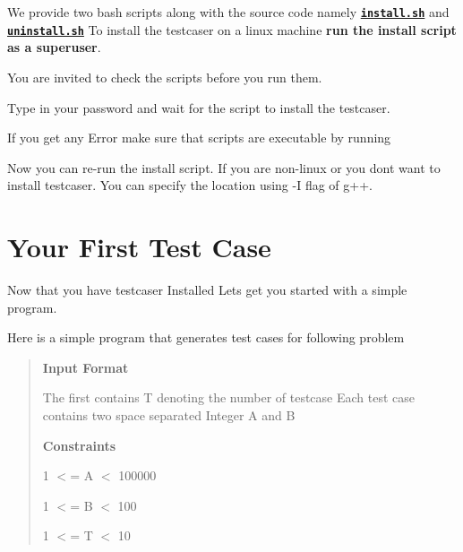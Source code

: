 We provide two bash scripts along with the source code namely 
\href{https://github.com/coder3101/testcaser/blob/master/install.sh}{\texttt{ {\bfseries{install.\+sh}}}} and 
\href{https://github.com/coder3101/testcaser/blob/master/uninstall.sh}{\texttt{ {\bfseries{uninstall.\+sh}}}} To install the testcaser on a linux machine {\bfseries{run the install script as a superuser}}.

You are invited to check the scripts before you run them.


\begin{DoxyCode}{0}
\end{DoxyCode}


Type in your password and wait for the script to install the testcaser.

If you get any Error make sure that scripts are executable by running 
\begin{DoxyCode}{0}
\end{DoxyCode}


Now you can re-\/run the install script. If you are non-\/linux or you don\textquotesingle{}t want to install testcaser. You can specify the location using {\ttfamily -\/I} flag of {\ttfamily g++}. 

\hypertarget{index_started}{}\section{Your First Test Case}\label{index_started}
Now that you have testcaser Installed Let\textquotesingle{}s get you started with a simple program.

Here is a simple program that generates test cases for following problem \begin{quote}
{\bfseries{Input Format}}

The first contains T denoting the number of testcase Each test case contains two space separated Integer A and B

{\bfseries{Constraints}}

1 $<$= A $<$ 100000

1 $<$= B $<$ 100

1 $<$= T $<$ 10 \end{quote}




